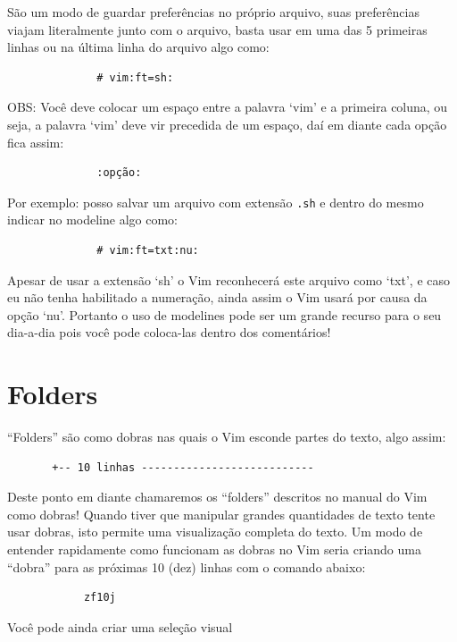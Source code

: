 \documentclass[10pt,a4paper,openany]{book}
\begin{document}
São um modo de guardar preferências no próprio arquivo, suas
preferências viajam literalmente junto com o arquivo, basta usar em
uma das 5 primeiras linhas ou na última linha do arquivo algo
como:

\begin{verbatim}
			  # vim:ft=sh:
\end{verbatim}

OBS: Você deve colocar um espaço entre a palavra `vim' e a primeira
coluna, ou seja, a palavra `vim' deve vir precedida de um espaço, daí
em diante cada opção fica assim:

\begin{verbatim}
			  :opção:
\end{verbatim}

Por exemplo: posso salvar um arquivo com extensão \verb|.sh| e dentro do
mesmo indicar no modeline algo como:

\begin{verbatim}
			  # vim:ft=txt:nu:
\end{verbatim}

Apesar de usar a extensão `sh' o Vim reconhecerá este arquivo como `txt', e
caso eu não tenha habilitado a numeração, ainda assim o Vim usará por causa da
opção `nu'.  Portanto o uso de modelines  pode ser um grande recurso para o seu
dia-a-dia pois você pode coloca-las dentro dos comentários!


\chapter{Folders}\label{cha:Folders}
``Folders'' são como dobras nas quais o Vim esconde partes do texto,
algo assim:

\begin{verbatim}
	   +-- 10 linhas ---------------------------
\end{verbatim}

Deste ponto em diante chamaremos os ``folders'' descritos no manual do
Vim como dobras!  Quando tiver que manipular grandes quantidades de
texto tente usar dobras, isto permite uma visualização completa do
texto.  Um modo de entender rapidamente como funcionam as dobras no
Vim seria criando uma ``dobra'' para as próximas 10 (dez) linhas com o
comando abaixo:

\begin{verbatim}
			zf10j
\end{verbatim}

Você pode ainda criar uma seleção visual
\end{document}
